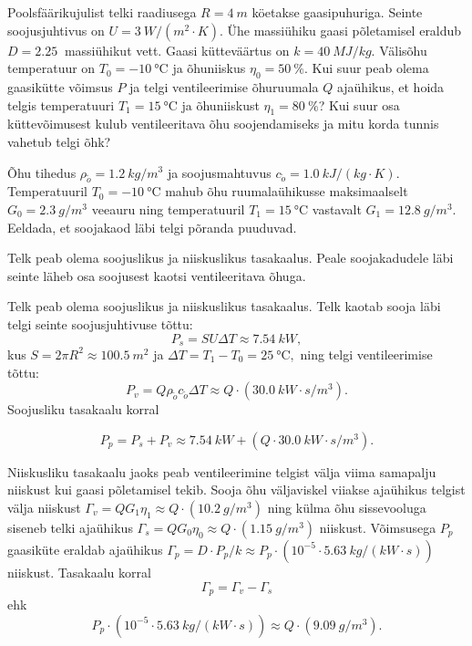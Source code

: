 
Poolsfäärikujulist telki raadiusega $R=\SI{4}{m}$ köetakse
gaasipuhuriga. Seinte soojusjuhtivus on $U=\SI{3}{W/(m^{2}\cdot K)}$.
Ühe massiühiku gaasi põletamisel eraldub $D=\SI{2.25}{}$ massiühikut vett. Gaasi kütteväärtus on $k=\SI{40}{MJ/kg}$. Välisõhu temperatuur on $T_{0}=\SI{-10}{\degreeCelsius}$
ja õhuniiskus $\eta_{0}=\SI{50}{\percent}.$ Kui suur peab olema gaasikütte
võimsus $P$ ja telgi ventileerimise õhuruumala $Q$ ajaühikus, et hoida telgis
temperatuuri $T_{1}=\SI{15}{\degreeCelsius}$ ja õhuniiskust $\eta_{1}=\SI{80}{\percent}$?
Kui suur osa küttevõimusest kulub ventileeritava õhu soojendamiseks
ja mitu korda tunnis vahetub telgi õhk?

Õhu tihedus $\rho_{\tilde{o}}=\SI{1.2}{kg/m^{3}}$ ja soojusmahtuvus
$c_{\tilde{o}}=\SI{1.0}{kJ/(kg\cdot K)}$. Temperatuuril
$T_{0}=\SI{-10}{\degreeCelsius}$ mahub õhu ruumalaühikusse maksimaalselt
$G_{0}=\SI{2.3}{g/m^{3}}$ veeauru ning temperatuuril $T_{1}=\SI{15}{\degreeCelsius}$
vastavalt $G_{1}=\SI{12.8}{g/m^{3}}.$ Eeldada, et soojakaod läbi
telgi põranda puuduvad.

\hint
Telk peab olema soojuslikus ja niiskuslikus tasakaalus. Peale soojakadudele läbi seinte läheb osa soojusest kaotsi ventileeritava õhuga.

\solu
Telk peab olema soojuslikus ja niiskuslikus tasakaalus. Telk kaotab
sooja läbi telgi seinte soojusjuhtivuse tõttu:
\[
P_{s}=SU\Delta T\approx\SI{7.54}{kW},
\]
kus $S=2\pi R^{2}\approx\SI{100.5}{m^{2}}$
ja $\Delta T=T_{1}-T_{0}=\SI{25}{\degreeCelsius},$ ning telgi ventileerimise tõttu:
\[
P_{v}=Q\rho_{\tilde{o}}c_{\tilde{o}}\Delta T\approx Q\cdot\left(\SI{30.0}{kW\cdot s/m^{3}}\right).
\]
Soojusliku tasakaalu korral

\begin{equation}
P_{p}=P_{s}+P_{v}\approx\SI{7.54}{kW}+\left(Q\cdot\SI{30.0}{kW\cdot s/m^{3}}\right).\label{eq:2017-v2g-10-gaas-eq1}
\end{equation}


Niiskusliku tasakaalu jaoks peab ventileerimine telgist välja viima
samapalju niiskust kui gaasi põletamisel tekib. Sooja õhu väljaviskel
viiakse ajaühikus telgist välja niiskust $\Gamma_{v}=QG_{1}\eta_{1}\approx Q\cdot\left(\SI{10.2}{g/m^{3}}\right)$
ning külma õhu sissevooluga siseneb telki ajaühikus $\Gamma_{s}=QG_{0}\eta_{0}\approx Q\cdot\left(\SI{1.15}{g/m^{3}}\right)$
niiskust. Võimsusega $P_{p}$ gaasiküte eraldab ajaühikus
$\Gamma_{p}=D\cdot P_{p}/k\approx P_{p}\cdot\left(10^{-5}\cdot\SI{5.63}{kg/\left(kW\cdot s\right)}\right)$
niiskust. Tasakaalu korral
\vspace{-3pt}
\[
\Gamma_{p}=\Gamma_{v}-\Gamma_{s}
\]
\vspace{-3pt}
\noindent ehk
\vspace{-3pt}
\begin{equation}
P_{p}\cdot\left(10^{-5}\cdot\SI{5.63}{kg/\left(kW\cdot s\right)}\right)\approx Q\cdot\left(\SI{9.09}{g/m^{3}}\right).\label{eq:2017-v2g-10-gaas-eq2}
\end{equation}


